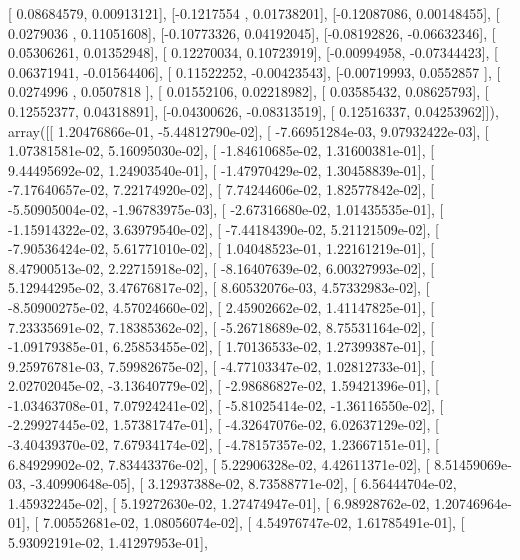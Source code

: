 \documentclass{article}
\begin{document}
       [ 0.08684579,  0.00913121],
       [-0.1217554 ,  0.01738201],
       [-0.12087086,  0.00148455],
       [ 0.0279036 ,  0.11051608],
       [-0.10773326,  0.04192045],
       [-0.08192826, -0.06632346],
       [ 0.05306261,  0.01352948],
       [ 0.12270034,  0.10723919],
       [-0.00994958, -0.07344423],
       [ 0.06371941, -0.01564406],
       [ 0.11522252, -0.00423543],
       [-0.00719993,  0.0552857 ],
       [ 0.0274996 ,  0.0507818 ],
       [ 0.01552106,  0.02218982],
       [ 0.03585432,  0.08625793],
       [ 0.12552377,  0.04318891],
       [-0.04300626, -0.08313519],
       [ 0.12516337,  0.04253962]]), array([[  1.20476866e-01,  -5.44812790e-02],
       [ -7.66951284e-03,   9.07932422e-03],
       [  1.07381581e-02,   5.16095030e-02],
       [ -1.84610685e-02,   1.31600381e-01],
       [  9.44495692e-02,   1.24903540e-01],
       [ -1.47970429e-02,   1.30458839e-01],
       [ -7.17640657e-02,   7.22174920e-02],
       [  7.74244606e-02,   1.82577842e-02],
       [ -5.50905004e-02,  -1.96783975e-03],
       [ -2.67316680e-02,   1.01435535e-01],
       [ -1.15914322e-02,   3.63979540e-02],
       [ -7.44184390e-02,   5.21121509e-02],
       [ -7.90536424e-02,   5.61771010e-02],
       [  1.04048523e-01,   1.22161219e-01],
       [  8.47900513e-02,   2.22715918e-02],
       [ -8.16407639e-02,   6.00327993e-02],
       [  5.12944295e-02,   3.47676817e-02],
       [  8.60532076e-03,   4.57332983e-02],
       [ -8.50900275e-02,   4.57024660e-02],
       [  2.45902662e-02,   1.41147825e-01],
       [  7.23335691e-02,   7.18385362e-02],
       [ -5.26718689e-02,   8.75531164e-02],
       [ -1.09179385e-01,   6.25853455e-02],
       [  1.70136533e-02,   1.27399387e-01],
       [  9.25976781e-03,   7.59982675e-02],
       [ -4.77103347e-02,   1.02812733e-01],
       [  2.02702045e-02,  -3.13640779e-02],
       [ -2.98686827e-02,   1.59421396e-01],
       [ -1.03463708e-01,   7.07924241e-02],
       [ -5.81025414e-02,  -1.36116550e-02],
       [ -2.29927445e-02,   1.57381747e-01],
       [ -4.32647076e-02,   6.02637129e-02],
       [ -3.40439370e-02,   7.67934174e-02],
       [ -4.78157357e-02,   1.23667151e-01],
       [  6.84929902e-02,   7.83443376e-02],
       [  5.22906328e-02,   4.42611371e-02],
       [  8.51459069e-03,  -3.40990648e-05],
       [  3.12937388e-02,   8.73588771e-02],
       [  6.56444704e-02,   1.45932245e-02],
       [  5.19272630e-02,   1.27474947e-01],
       [  6.98928762e-02,   1.20746964e-01],
       [  7.00552681e-02,   1.08056074e-02],
       [  4.54976747e-02,   1.61785491e-01],
       [  5.93092191e-02,   1.41297953e-01],
\end{document}
